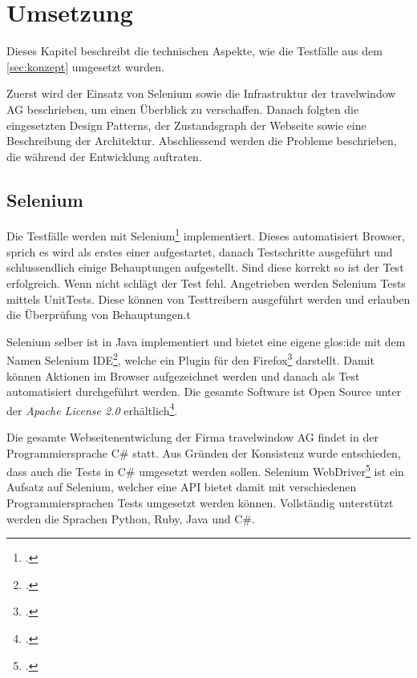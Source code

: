 

\chapter{Umsetzung}
\label{sec:umsetzung}

Dieses Kapitel beschreibt die technischen Aspekte, wie die Testfälle aus dem \cref{sec:konzept}  umgesetzt wurden.

Zuerst wird der Einsatz von Selenium sowie die Infrastruktur der travelwindow AG beschrieben, um einen Überblick zu verschaffen. Danach folgten die eingesetzten Design Patterns, der Zustandsgraph der Webseite sowie eine Beschreibung der Architektur. Abschliessend werden die Probleme beschrieben, die während der Entwicklung auftraten.

\section{Selenium}
\label{sec:umsetzung:selenium}
Die Testfälle werden mit Selenium\footcite{Selenium_-_Web_Browser_Automation_2015-09-26} implementiert. Dieses automatisiert Browser, sprich es wird als erstes einer aufgestartet, danach Testschritte ausgeführt und schlussendlich einige Behauptungen aufgestellt. Sind diese korrekt so ist der Test erfolgreich. Wenn nicht schlägt der Test fehl. 
Angetrieben werden Selenium Tests mittels UnitTests. Diese können von Testtreibern ausgeführt werden und erlauben die Überprüfung von Behauptungen.t

Selenium selber ist in Java implementiert und bietet eine eigene \Gls{glos:ide} mit dem Namen Selenium IDE\footcite{Selenium_IDE_Plugins_2015-09-26}, welche ein Plugin für den Firefox\footcite{Download_Firefox__Free_Web_Browser__Mozilla_2015-09-26} darstellt. Damit können Aktionen im Browser aufgezeichnet werden und danach als Test automatisiert durchgeführt werden. Die gesamte Software ist Open Source unter der \textit{Apache License 2.0} erhältlich\footcite{Selenium_software_-_Wikipedia,_the_free_encyclopedia_2015-09-26}.

Die gesamte Webseitenentwiclung der Firma travelwindow AG findet in der Programmiersprache C\# statt. Aus Gründen der Konsistenz wurde entschieden, dass auch die Tests in C\# umgesetzt werden sollen. 
Selenium WebDriver\footcite{Selenium_WebDriver_2015-09-26} ist ein Aufsatz auf Selenium, welcher eine API bietet damit mit verschiedenen Programmiersprachen Tests umgesetzt werden können. Vollständig unterstützt werden die Sprachen Python, Ruby, Java und C\#. 

